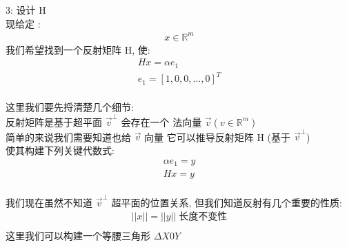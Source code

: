 \documentclass[12pt]{article}
\begin{document}
\begin{flushleft}
\begin{figure}[htbp]
\begin{tikzpicture}[
                x={(0.866cm,-0.5cm)},
                y={(-0.866cm,-0.5cm)},
                z={(0cm,1cm)},
                scale=1.2
            ]
        \end{tikzpicture}
    \end{figure}

    3: 设计 H  \\
    现给定 : \\
    \begin{align}
        x \in \mathbb{R}^{m}
    \end{align}
    我们希望找到一个反射矩阵 H, 使:
    \begin{align}
        Hx = \alpha e_{1}             \\
        e_{1} = [1, 0, 0, ..., 0]^{T} \\
    \end{align}

    这里我们要先捋清楚几个细节: \\
    反射矩阵是基于超平面 $\vec{v}^{\perp}$ 会存在一个 法向量 $\vec{v} (v \in \mathbb{R}^{m})$ \\
    简单的来说我们需要知道也给 $\vec{v}$ 向量 它可以推导反射矩阵 H (基于 $\vec{v}^{\perp}$) \\
    使其构建下列关键代数式: \\
    \begin{align}
        \alpha e_{1} = y \\
        Hx = y           \\
    \end{align}

    我们现在虽然不知道  $\vec{v}^{\perp}$ 超平面的位置关系, 但我们知道反射有几个重要的性质: \\
    \begin{align}
        ||x|| = ||y|| \;  \text{长度不变性} \\
    \end{align}
    这里我们可以构建一个等腰三角形 $\Delta X0Y$

    \begin{figure}[htbp]
        \centering
\end{figure}
\end{flushleft}
\end{document}
